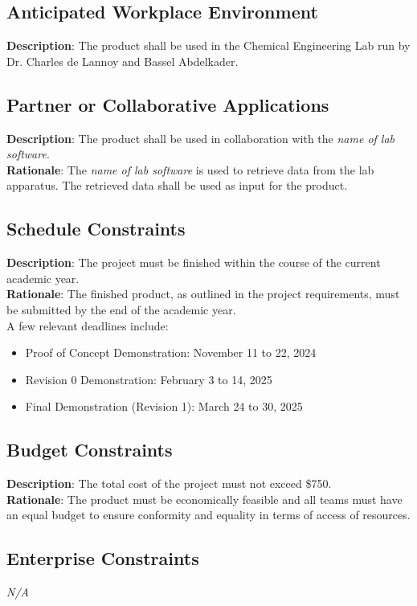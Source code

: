 \documentclass[12pt]{article}
\begin{document}
\subsection{Anticipated Workplace Environment}
\textbf{Description}: The product shall be used in the Chemical Engineering Lab run by Dr. Charles de Lannoy and Bassel Abdelkader.

\subsection{Partner or Collaborative Applications}
\textbf{Description}: The product shall be used in collaboration with the \emph{name of lab software}.\\
\textbf{Rationale}: The \emph{name of lab software} is used to retrieve data from the lab apparatus. The retrieved data shall be used as input for the product.

\subsection{Schedule Constraints}
\textbf{Description}: The project must be finished within the course of the current academic year.\\
\textbf{Rationale}: The finished product, as outlined in the project requirements, must be submitted by the end of the academic year.\\
\newline
A few relevant deadlines include:
\begin{itemize}
  \item Proof of Concept Demonstration: November 11 to 22, 2024
  \item Revision 0 Demonstration: February 3 to 14, 2025
  \item Final Demonstration (Revision 1): March 24 to 30, 2025
\end{itemize}

\subsection{Budget Constraints}
\textbf{Description}: The total cost of the project must not exceed \$750.\\
\textbf{Rationale}: The product must be economically feasible and all teams must have an equal budget to ensure conformity and equality in terms of access of resources.

\subsection{Enterprise Constraints}
\emph{N/A}
\end{document}
